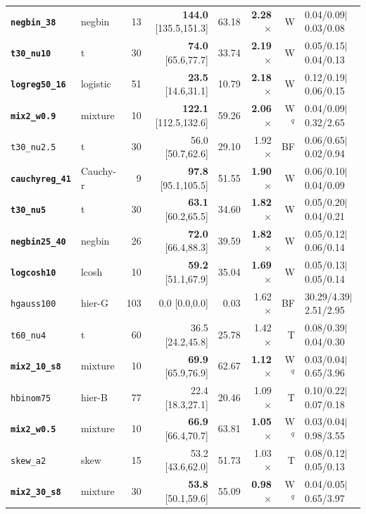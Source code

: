 {\begin{longtable}{llrrrrrl}
\textbf{\texttt{negbin\_38}} & negbin & 13 & \textbf{144.0} [135.5,151.3] & 63.18 & \textbf{2.28$\times$} & W & 0.04/0.09$\mid$0.03/0.08\\
\textbf{\texttt{t30\_nu10}} & t & 30 & \textbf{74.0} [65.6,77.7] & 33.74 & \textbf{2.19$\times$} & W & 0.05/0.15$\mid$0.04/0.13\\
\textbf{\texttt{logreg50\_16}} & logistic & 51 & \textbf{23.5} [14.6,31.1] & 10.79 & \textbf{2.18$\times$} & W & 0.12/0.19$\mid$0.06/0.15\\
\textbf{\texttt{mix2\_w0.9}} & mixture & 10 & \textbf{122.1} [112.5,132.6] & 59.26 & \textbf{2.06$\times$} & W$^q$ & 0.04/0.09$\mid$0.32/2.65\\
\texttt{t30\_nu2.5} & t & 30 & 56.0 [50.7,62.6] & 29.10 & 1.92$\times$ & BF & 0.06/0.65$\mid$0.02/0.94\\
\textbf{\texttt{cauchyreg\_41}} & Cauchy-r & 9 & \textbf{97.8} [95.1,105.5] & 51.55 & \textbf{1.90$\times$} & W & 0.06/0.10$\mid$0.04/0.09\\
\textbf{\texttt{t30\_nu5}} & t & 30 & \textbf{63.1} [60.2,65.5] & 34.60 & \textbf{1.82$\times$} & W & 0.05/0.20$\mid$0.04/0.21\\
\textbf{\texttt{negbin25\_40}} & negbin & 26 & \textbf{72.0} [66.4,88.3] & 39.59 & \textbf{1.82$\times$} & W & 0.05/0.12$\mid$0.06/0.14\\
\textbf{\texttt{logcosh10}} & lcosh & 10 & \textbf{59.2} [51.1,67.9] & 35.04 & \textbf{1.69$\times$} & W & 0.05/0.13$\mid$0.05/0.14\\
\texttt{hgauss100} & hier-G & 103 & 0.0 [0.0,0.0] & 0.03 & 1.62$\times$ & BF & 30.29/4.39$\mid$2.51/2.95\\
\texttt{t60\_nu4} & t & 60 & 36.5 [24.2,45.8] & 25.78 & 1.42$\times$ & T & 0.08/0.39$\mid$0.04/0.30\\
\textbf{\texttt{mix2\_10\_s8}} & mixture & 10 & \textbf{69.9} [65.9,76.9] & 62.67 & \textbf{1.12$\times$} & W$^q$ & 0.03/0.04$\mid$0.65/3.96\\
\texttt{hbinom75} & hier-B & 77 & 22.4 [18.3,27.1] & 20.46 & 1.09$\times$ & T & 0.10/0.22$\mid$0.07/0.18\\
\textbf{\texttt{mix2\_w0.5}} & mixture & 10 & \textbf{66.9} [66.4,70.7] & 63.81 & \textbf{1.05$\times$} & W$^q$ & 0.03/0.04$\mid$0.98/3.55\\
\texttt{skew\_a2} & skew & 15 & 53.2 [43.6,62.0] & 51.73 & 1.03$\times$ & T & 0.08/0.12$\mid$0.05/0.13\\
\textbf{\texttt{mix2\_30\_s8}} & mixture & 30 & \textbf{53.8} [50.1,59.6] & 55.09 & \textbf{0.98$\times$} & W$^q$ & 0.04/0.05$\mid$0.65/3.97\\

\end{longtable}}
